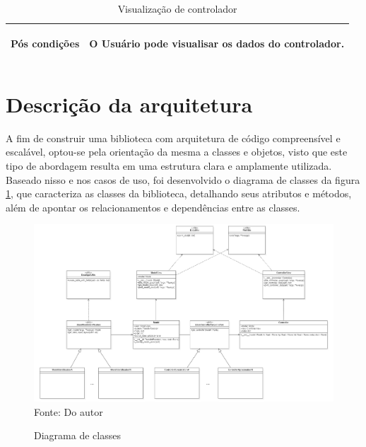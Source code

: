 \begin{table}[H]
\begin{center}
\begin{tabularx}{\textwidth}{|>{\bfseries\raggedright\arraybackslash\center}m{5cm}|X|}
            Pós condições                                   & O Usuário pode visualisar os dados do controlador.                                                                                                                                                                                                                                       \\ \hline
        \end{tabularx}
        \caption{Visualização de controlador}
        \label{tab:uc5}
    \end{center}
\end{table}




\section{Descrição da arquitetura}\label{sec:descarc}

A fim de construir uma biblioteca com arquitetura de código compreensível e escalável, optou-se pela orientação
da mesma a classes e objetos, visto que este tipo de abordagem resulta em uma estrutura clara e amplamente utilizada.
Baseado nisso e nos casos de uso, foi desenvolvido o diagrama de classes da figura \ref{fig:class_diag}, que caracteriza
as classes da biblioteca, detalhando seus atributos e métodos, além de apontar os relacionamentos e dependências entre
as classes.

\begin{figure}[H]
    \centering
    \caption{Diagrama de classes}
    \includegraphics[scale=0.32]{figuras/class_diag}
    \label{fig:class_diag}
    \\
    \vspace{0cm}\hspace{0cm}\small{Fonte: Do autor}
\end{figure}

